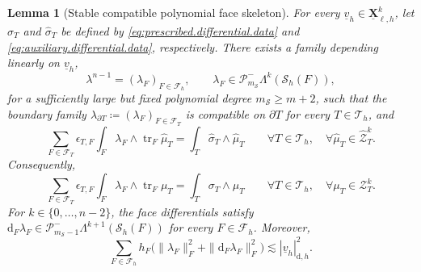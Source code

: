 \documentclass[a4paper,11pt]{article}
\newtheorem{lemma}[theorem]{Lemma}
\theoremstyle{definition}
\newcommand{\DIFF}{\mathrm{d}}
\newcommand{\Sh}{\mathcal{S}_h}
\newcommand{\PLtrim}[2]{\mathcal{P}_{#1}^{-}\Lambda^{#2}}
\newcommand{\uXh}[1]{\underline{\boldsymbol{X}}_{\ell,h}^{#1}}
\newcommand{\trc}{\operatorname{tr}}
\newcommand{\epsTF}{\epsilon_{T,F}}
\begin{document}
\begin{lemma}[Stable compatible polynomial face skeleton]
\label{lem:stable.face.skeleton}
For every $\underline v_h\in\uXh{k}$, let $\sigma_T$ and $\widehat\sigma_T$ be defined by \eqref{eq:prescribed.differential.data} and \eqref{eq:auxiliary.differential.data}, respectively.
There exists a family depending linearly on $\underline v_h$,
\[
  \lambda^{n-1}
  =
  (\lambda_F)_{F\in\mathcal F_h},
  \qquad
  \lambda_F
  \in
  \PLtrim{m_{\mathcal S}}{k}(\Sh(F)),
\]
for a sufficiently large but fixed polynomial degree $m_{\mathcal S}\geq m+2$, such that the boundary family $\lambda_{\partial T}\coloneqq(\lambda_F)_{F\in\mathcal F_T}$ is compatible on $\partial T$ for every $T\in\mathcal T_h$, and
\begin{equation}\label{eq:auxiliary.skeleton.identity}
  \sum_{F\in\mathcal F_T}
  \epsTF
  \int_F
  \lambda_F\wedge\trc_F\widehat\mu_T
  =
  \int_T
  \widehat\sigma_T\wedge\widehat\mu_T
  \qquad
  \forall T\in\mathcal T_h,\quad
  \forall\widehat\mu_T\in\widehat{\mathcal Z}_T^k.
\end{equation}
Consequently,
\begin{equation}\label{eq:prescribed.skeleton.identity}
  \sum_{F\in\mathcal F_T}
  \epsTF
  \int_F
  \lambda_F\wedge\trc_F\mu_T
  =
  \int_T
  \sigma_T\wedge\mu_T
  \qquad
  \forall T\in\mathcal T_h,\quad
  \forall\mu_T\in\mathcal Z_T^k.
\end{equation}
For $k\in\{0,\ldots,n-2\}$, the face differentials satisfy $\DIFF_F\lambda_F\in\PLtrim{m_{\mathcal S}-1}{k+1}(\Sh(F))$ for every $F\in\mathcal F_h$.
Moreover,
\begin{equation}\label{eq:face.skeleton.stability}
  \sum_{F\in\mathcal F_h}
  h_F\bigl(\|\lambda_F\|_F^2+\|\DIFF_F\lambda_F\|_F^2\bigr)
  \lesssim
  |\underline v_h|_{\DIFF,h}^2.
\end{equation}
\end{lemma}
\end{document}
